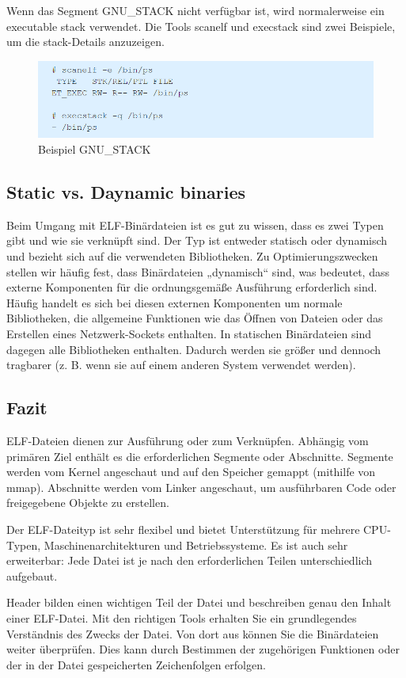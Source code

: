 Wenn das Segment GNU\_STACK nicht verfügbar ist, wird normalerweise ein executable stack verwendet.
Die Tools scanelf und execstack sind zwei Beispiele, um die stack-Details anzuzeigen.

\begin{figure}[H]
    \begin{center}
        \includegraphics[scale=1]{images/example_gnustack.png}
        \caption{Beispiel GNU\_STACK \cite{example_gnustack}}
    \end{center}
\end{figure}

\subsection{Static vs. Daynamic binaries}
Beim Umgang mit ELF-Binärdateien ist es gut zu wissen, dass es zwei Typen gibt und wie sie verknüpft sind. Der Typ ist entweder statisch oder dynamisch und bezieht sich auf die verwendeten Bibliotheken. Zu Optimierungszwecken stellen wir häufig fest, dass Binärdateien „dynamisch“ sind, was bedeutet, dass externe Komponenten für die ordnungsgemäße Ausführung erforderlich sind. Häufig handelt es sich bei diesen externen Komponenten um normale Bibliotheken, die allgemeine Funktionen wie das Öffnen von Dateien oder das Erstellen eines Netzwerk-Sockets enthalten. In statischen Binärdateien sind dagegen alle Bibliotheken enthalten. Dadurch werden sie größer und dennoch tragbarer (z. B. wenn sie auf einem anderen System verwendet werden).

\subsection{Fazit}
ELF-Dateien dienen zur Ausführung oder zum Verknüpfen. Abhängig vom primären Ziel enthält es die erforderlichen Segmente oder Abschnitte. Segmente werden vom Kernel angeschaut und auf den Speicher gemappt (mithilfe von mmap). Abschnitte werden vom Linker angeschaut, um ausführbaren Code oder freigegebene Objekte zu erstellen.

Der ELF-Dateityp ist sehr flexibel und bietet Unterstützung für mehrere CPU-Typen, Maschinenarchitekturen und Betriebssysteme. Es ist auch sehr erweiterbar: Jede Datei ist je nach den erforderlichen Teilen unterschiedlich aufgebaut.

Header bilden einen wichtigen Teil der Datei und beschreiben genau den Inhalt einer ELF-Datei. Mit den richtigen Tools erhalten Sie ein grundlegendes Verständnis des Zwecks der Datei. Von dort aus können Sie die Binärdateien weiter überprüfen. Dies kann durch Bestimmen der zugehörigen Funktionen oder der in der Datei gespeicherten Zeichenfolgen erfolgen.\cite{elf_linux_audit}